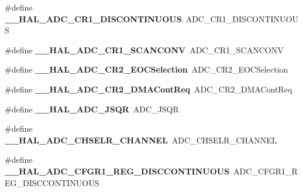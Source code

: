 \begin{DoxyCompactItemize}
\mbox{\label{group___h_a_l___a_d_c___aliased___macros_ga0906f1443571a5dc173f0a1561f514f4}} 
\#define {\bfseries \+\_\+\+\_\+\+H\+A\+L\+\_\+\+A\+D\+C\+\_\+\+C\+R1\+\_\+\+D\+I\+S\+C\+O\+N\+T\+I\+N\+U\+O\+US}~A\+D\+C\+\_\+\+C\+R1\+\_\+\+D\+I\+S\+C\+O\+N\+T\+I\+N\+U\+O\+US
\item 
\mbox{\label{group___h_a_l___a_d_c___aliased___macros_ga92d473f3afb5552b6e4a710410fcb2f1}} 
\#define {\bfseries \+\_\+\+\_\+\+H\+A\+L\+\_\+\+A\+D\+C\+\_\+\+C\+R1\+\_\+\+S\+C\+A\+N\+C\+O\+NV}~A\+D\+C\+\_\+\+C\+R1\+\_\+\+S\+C\+A\+N\+C\+O\+NV
\item 
\mbox{\label{group___h_a_l___a_d_c___aliased___macros_gafb4baec5d5d5ebf891a3cd8a9a0bfe65}} 
\#define {\bfseries \+\_\+\+\_\+\+H\+A\+L\+\_\+\+A\+D\+C\+\_\+\+C\+R2\+\_\+\+E\+O\+C\+Selection}~A\+D\+C\+\_\+\+C\+R2\+\_\+\+E\+O\+C\+Selection
\item 
\mbox{\label{group___h_a_l___a_d_c___aliased___macros_gaedcab24fbd762b1f6b65c7381f910308}} 
\#define {\bfseries \+\_\+\+\_\+\+H\+A\+L\+\_\+\+A\+D\+C\+\_\+\+C\+R2\+\_\+\+D\+M\+A\+Cont\+Req}~A\+D\+C\+\_\+\+C\+R2\+\_\+\+D\+M\+A\+Cont\+Req
\item 
\mbox{\label{group___h_a_l___a_d_c___aliased___macros_ga920c922d2385fcaab11b2ca7c8630da8}} 
\#define {\bfseries \+\_\+\+\_\+\+H\+A\+L\+\_\+\+A\+D\+C\+\_\+\+J\+S\+QR}~A\+D\+C\+\_\+\+J\+S\+QR
\item 
\mbox{\label{group___h_a_l___a_d_c___aliased___macros_gae5547f083abe059cacdcaac3e5066ea2}} 
\#define {\bfseries \+\_\+\+\_\+\+H\+A\+L\+\_\+\+A\+D\+C\+\_\+\+C\+H\+S\+E\+L\+R\+\_\+\+C\+H\+A\+N\+N\+EL}~A\+D\+C\+\_\+\+C\+H\+S\+E\+L\+R\+\_\+\+C\+H\+A\+N\+N\+EL
\item 
\mbox{\label{group___h_a_l___a_d_c___aliased___macros_ga3703e313dbcb2af3dea5a07d622e67c6}} 
\#define {\bfseries \+\_\+\+\_\+\+H\+A\+L\+\_\+\+A\+D\+C\+\_\+\+C\+F\+G\+R1\+\_\+\+R\+E\+G\+\_\+\+D\+I\+S\+C\+C\+O\+N\+T\+I\+N\+U\+O\+US}~A\+D\+C\+\_\+\+C\+F\+G\+R1\+\_\+\+R\+E\+G\+\_\+\+D\+I\+S\+C\+C\+O\+N\+T\+I\+N\+U\+O\+US

\end{DoxyCompactItemize}
